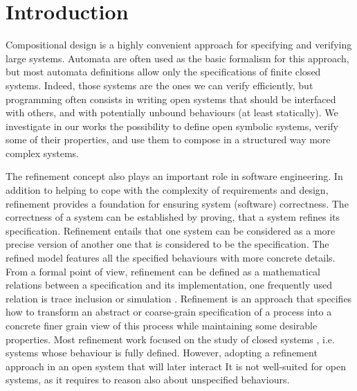 \documentclass[runningheads]{llncs}
\begin{document}
\section{Introduction}
%
%
%
%
%
%
%
%
%
 Compositional design is a highly convenient approach 
for specifying and verifying large systems. 
Automata are often used as the basic formalism for this approach, but most automata definitions allow only the specifications of finite closed systems. Indeed, those systems are the ones we can verify efficiently, but programming often consists in writing open systems that should be interfaced with others, and with potentially unbound behaviours (at least statically). We investigate in our works the possibility to define open symbolic systems, verify some of their properties, and use them to compose in a structured way more complex systems.


The refinement concept also plays  an important role in software engineering. In addition to helping to cope with the complexity of requirements and design, refinement provides a foundation for ensuring  system (software) correctness. The correctness of a system can
be established by proving, that a system refines its specification.
Refinement entails that one system  can be considered as a more precise version of another one that is considered to be the specification. The refined model features all the specified behaviours with more concrete details. From a formal point of view,  refinement can be defined as a mathematical relations between a specification and its implementation, one frequently used relation is trace inclusion or simulation  \cite{Milner:1980,Kouchnarenko:2007}.  Refinement is an approach that specifies how to transform an abstract or coarse-grain specification of a process into a concrete finer grain view of this process while maintaining some desirable properties.
Most  refinement work focused on  the study  of  closed
systems , i.e.  systems whose behaviour is fully defined.  
However, adopting a refinement approach in an open system that will later interact 
It is not well-suited for open systems,  as it requires to reason also about unspecified behaviours.
\end{document}
